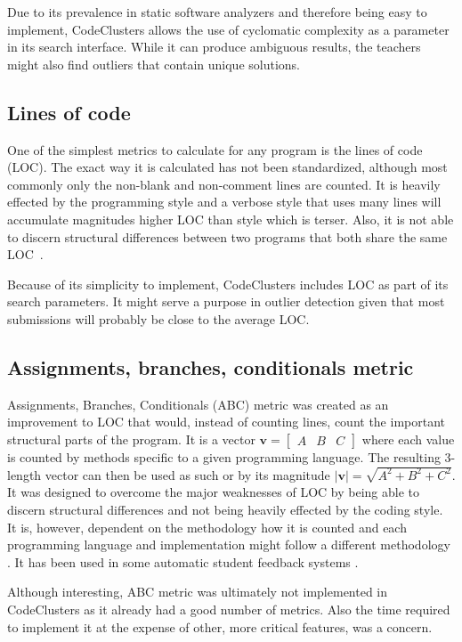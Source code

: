 Due to its prevalence in static software analyzers and therefore being easy to implement, CodeClusters allows the use of cyclomatic complexity as a parameter in its search interface. While it can produce ambiguous results, the teachers might also find outliers that contain unique solutions.

\iffalse
CodeClusters also includes NPath metric which was created as an improvement to cyclomatic complexity.
\fi

\subsection{Lines of code}

One of the simplest metrics to calculate for any program is the lines of code (LOC). The exact way it is calculated has not been standardized, although most commonly only the non-blank and non-comment lines are counted. It is heavily effected by the programming style and a verbose style that uses many lines will accumulate magnitudes higher LOC than style which is terser. Also, it is not able to discern structural differences between two programs that both share the same LOC~\cite{abc-metric}.

Because of its simplicity to implement, CodeClusters includes LOC as part of its search parameters. It might serve a purpose in outlier detection given that most submissions will probably be close to the average LOC.

\subsection{Assignments, branches, conditionals metric}

Assignments, Branches, Conditionals (ABC) metric was created as an improvement to LOC that would, instead of counting lines, count the important structural parts of the program. It is a vector $\mathbf{v}=\begin{bmatrix} A & B & C \end{bmatrix}$ where each value is counted by methods specific to a given programming language. The resulting 3-length vector can then be used as such or by its magnitude $|\mathbf{v}|=\sqrt{A^2+B^2+C^2}$. It was designed to overcome the major weaknesses of LOC by being able to discern structural differences and not being heavily effected by the coding style. It is, however, dependent on the methodology how it is counted and each programming language and implementation might follow a different methodology \cite{abc-metric}. It has been used in some automatic student feedback systems \cite{fox-roy-autostyle-msc-2016}.

Although interesting, ABC metric was ultimately not implemented in CodeClusters as it already had a good number of metrics. Also the time required to implement it at the expense of other, more critical features, was a concern.
